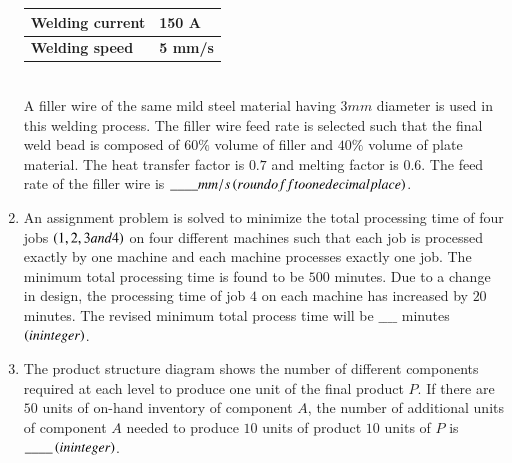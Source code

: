 \documentclass[journal]{IEEEtran}
\begin{document}
\begin{enumerate}
\begin{table}[h!]
\begin{tabular}{|m{5cm}|m{3cm}|}
    \hline
    \textbf{Welding current} & \textbf{150 A} \\ 
    \hline
    \textbf{Welding speed} & \textbf{5 mm/s} \\ 
    \hline
\end{tabular}
\end{table}\\
     A filler wire of the same mild steel material having $3 mm$ diameter is used in this welding process. The filler wire feed rate is selected such that the final weld bead is composed of $60\%$ volume of filler and $40\%$ volume of plate material. The heat transfer factor is $0.7$ and melting factor is $0.6$. The feed rate of the filler wire is $\_\_\_\_ mm/s \brak{round off to one decimal place}$.\\
     \item An assignment problem is solved to minimize the total processing time of four jobs $\brak{1,2,3 and 4}$ on four different machines such that each job is processed exactly by one machine and each machine processes exactly one job. The minimum total processing time is found to be $500$ minutes. Due to a change in design, the processing time of job $4$ on each machine has increased by $20$ minutes. The revised minimum total process time will be $\_\_\_\_$ minutes $\brak{in integer}$.\\
     \item The product structure diagram shows the number of different components required 
     at each level to produce one unit of the final product $P$. If there are $50$ units of on-hand inventory of component $A$, the number of additional units of component $A$ needed to produce $10$ units of product $10$ units of $P$ is $\_\_\_\_ \brak{in integer}$.\\
\begin{tikzpicture}[
  level distance=1.5cm,
  level 1/.style={sibling distance=4cm},
  level 2/.style={sibling distance=3cm},
  level 3/.style={sibling distance=2cm},
  every node/.style={draw, rectangle, minimum width=1.5cm, minimum height=1cm}
  ]


\end{tikzpicture}
\end{enumerate}
\end{document}
